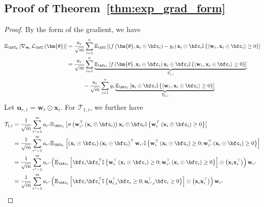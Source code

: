 \documentclass[10pt]{article} %
\theoremstyle{definition}
\theoremstyle{plain}
\newcommand{\paren}[1]{\left(#1\right)}
\newcommand{\inner}[2]{\left\langle#1, #2\right\rangle}
\providecommand{\E}{\mathbb{E}}
\def\calL{{\mathcal{L}}}
\def\bfu{{\mathbf{u}}}\def\bfv{{\mathbf{v}}}\def\bfw{{\mathbf{w}}}\def\bfx{{\mathbf{x}}}
\begin{document}
\subsection{Proof of Theorem~\ref{thm:exp_grad_form}}
\label{sec:proof_exp_grad}
\begin{proof}
    By the form of the gradient, we have
    \begin{equation}
        \label{eq:exp_grad}
        \begin{aligned}
            \E_{\bfC_k}\left[\nabla_{\bfw_r}\calL_{\bfC}\paren{\bm{\theta}}\right] & = \frac{a_r}{\sqrt{m}}\sum_{i=1}^n\E_{\bfC}\left[\paren{f\paren{\bm{\theta},\bfx_i\odot\bfc_i} - y_i}\bfx_i\odot\bfc_i\mathbb{I}\left\{\inner{\bfw_{r}}{\bfx_i\odot\bfc_i}\geq 0\right\}\right]\\
            & = \frac{a_r}{\sqrt{m}}\sum_{i=1}^n\underbrace{\E_{\bfc_{i}}\left[f\paren{\bm{\theta},\bfx_i\odot\bfc_i}\bfx_i\odot\bfc_i\mathbb{I}\left\{\inner{\bfw_{r}}{\bfx_i\odot\bfc_i}\geq 0\right\}\right]}_{\mathcal{T}_{1,i}}\\
            &\quad\quad\quad - \frac{a_r}{\sqrt{m}}\sum_{i=1}^ny_i\underbrace{\E_{\bfc_{i}}\left[\bfx_i\odot\bfc_i\mathbb{I}\left\{\inner{\bfw_{r}}{\bfx_i\odot\bfc_i}\geq 0\right\}\right]}_{\mathcal{T}_{2,i}}
        \end{aligned}
    \end{equation}
    Let $\bfu_{r,i} = \bfw_{r}\odot\bfx_i$. For $\mathcal{T}_{1,i}$, we further have
    \begin{align*}
        \mathcal{T}_{1,i} & = \frac{1}{\sqrt{m}}\sum_{r'=1}^ma_{r'}\E_{\bfc_{i}}\left[\sigma\paren{\bfw_{r'}^\top\paren{\bfx_i\odot\bfc_{i}}}\bfx_i\odot\bfc_{i}\mathbb{I}\left\{\bfw_{r}^\top\paren{\bfx_i\odot\bfc_{i}}\geq 0\right\}\right]\\
        & = \frac{1}{\sqrt{m}}\sum_{r'=1}^ma_{r'}\E_{\bfc_{i}}\left[\paren{\bfx_i\odot\bfc_{i}}\paren{\bfx_i\odot\bfc_{i}}^\top\bfw_{r'}\mathbb{I}\left\{\bfw_{r}^\top\paren{\bfx_i\odot\bfc_{i}}\geq 0;\bfw_{r'}^\top\paren{\bfx_i\odot\bfc_{i}}\geq 0\right\}\right]\\
        & = \frac{1}{\sqrt{m}}\sum_{r'=1}^ma_{r'}\paren{\E_{\bfc_{i}}\left[\bfc_{i}\bfc_{i}^\top\mathbb{I}\left\{\bfw_{r}^\top\paren{\bfx_i\odot\bfc_{i}}\geq 0;\bfw_{r'}^\top\paren{\bfx_i\odot\bfc_{i}}\geq 0\right\}\right]\odot\paren{\bfx_i\bfx_i^\top}}\bfw_{r'}\\
        & = \frac{1}{\sqrt{m}}\sum_{r'=1}^ma_{r'}\paren{\E_{\bfc_{i}}\left[\bfc_{i}\bfc_{i}^\top\mathbb{I}\left\{\bfu_{r,i}^\top\bfc_{i}\geq 0;\bfu_{r',i}^\top\bfc_{i}\geq 0\right\}\right]\odot\paren{\bfx_i\bfx_i^\top}}\bfw_{r'}\\

\end{align*}
\end{proof}
\end{document}
